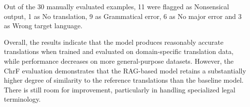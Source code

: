 \documentclass[fleqn,moreauthors,10pt]{ds_report}
\begin{document}
\newline



Out of the 30 manually evaluated examples, 11 were flagged as Nonsensical output, 1 as No translation, 9 as Grammatical error, 6 as No major error and 3 as Wrong target language. 

Overall, the results indicate that the model produces reasonably accurate translations when trained and evaluated on domain-specific translation data, while performance decreases on more general-purpose datasets. However, the ChrF evaluation demonstrates that the RAG-based model retains a substantially higher degree of similarity to the reference translations than the baseline model. There is still room for improvement, particularly in handling specialized legal terminology.



\end{document}
